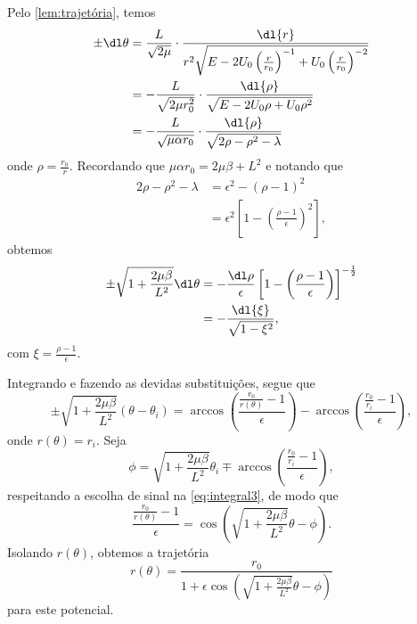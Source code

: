 Pelo \cref{lem:trajetória}, temos
\begin{align}
    \pm \dl\theta &= \frac{L}{\sqrt{2\mu}}\cdot\frac{\dl{r}}{r^2\sqrt{E - 2U_0\left(\frac{r}{r_0}\right)^{-1} + U_0\left(\frac{r}{r_0}\right)^{-2}}}\\
                  &= -\frac{L}{\sqrt{2\mu r_0^2}}\cdot\frac{\dl{\rho}}{\sqrt{E - 2U_0\rho + U_0 \rho^2}}\\
                  &= -\frac{L}{\sqrt{\mu \alpha r_0}} \cdot \frac{\dl{\rho}}{\sqrt{2\rho - \rho^2 - \lambda}}
\end{align}
onde \(\rho = \frac{r_0}{r}\). Recordando que \(\mu \alpha r_0 = 2\mu\beta + L^2\) e notando que
\begin{align}
    2\rho - \rho^2 - \lambda &= \epsilon^2 - (\rho - 1)^2\\
                             &= \epsilon^2\left[1 - \left(\frac{\rho - 1}{\epsilon}\right)^2\right],
\end{align}
obtemos
\begin{align}
    \pm\sqrt{1 + \frac{2\mu\beta}{L^2}}\dl\theta &= -\frac{\dl \rho}{\epsilon} \left[1 - \left(\frac{\rho - 1}{\epsilon}\right)\right]^{-\frac12}\\
                                                 &= -\frac{\dl{\xi}}{\sqrt{1 - \xi^2}},
\end{align}
com \(\xi = \frac{\rho - 1}{\epsilon}\).

Integrando e fazendo as devidas substituições, segue que
\begin{equation}
    \pm \sqrt{1 + \frac{2\mu \beta}{L^2}}\left(\theta - \theta_i\right) = \arccos{\left(\frac{\frac{r_0}{r(\theta)}-1}{\epsilon}\right)} - \arccos{\left(\frac{\frac{r_0}{r_i}-1}{\epsilon}\right)},
    \label{eq:integral3}
\end{equation}
onde \(r(\theta) = r_i\). Seja
\begin{equation}
    \phi = \sqrt{1+\frac{2\mu\beta}{L^2}}\theta_i \mp \arccos{\left(\frac{\frac{r_0}{r_i}-1}{\epsilon}\right)},
\end{equation}
respeitando a escolha de sinal na \cref{eq:integral3}, de modo que
\begin{equation}
    \frac{\frac{r_0}{r(\theta)}-1}{\epsilon} = \cos\left(\sqrt{1 + \frac{2\mu\beta}{L^2}}\theta - \phi\right).
\end{equation}
Isolando \(r(\theta)\), obtemos a trajetória
\begin{equation}
    r(\theta) = \frac{r_0}{1 + \epsilon \cos{\left(\sqrt{1 + \frac{2\mu\beta}{L^2}}\theta - \phi\right)}}
\end{equation}
para este potencial.
